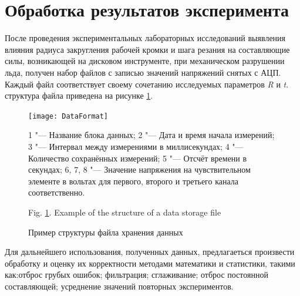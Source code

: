 
\section{Обработка результатов эксперимента}

После проведения экспериментальных лабораторных исследований выявления влияния радиуса закругления рабочей кромки и шага резания на составляющие силы, возникающей на дисковом инструменте, при механическом разрушении льда, получен набор файлов с записью значений напряжений снятых с АЦП. Каждый файл соответствует своему сочетанию исследуемых параметров \textit{R} и \textit{t}. структура файла приведена на рисунке \ref{fig:FileMap}.
\begin{figure}[ht]
	\centering
	\texttt{[image: DataFormat]}%

	1 "--- Название блока данных; 2 "--- Дата и время начала измерений; 3 "--- Интервал между измерениями в миллисекундах; 4 "--- Количество сохранённых измерений; 5 "--- Отсчёт времени в секундах; 6, 7, 8 "--- Значение напряжения на чувствительном элементе в вольтах для первого, второго и третьего канала соответственно.
	\caption{Пример структуры файла хранения данных}
	\label{fig:FileMap}
	Fig. \ref{fig:FileMap}. Example of the structure of a data storage file
\end{figure}
Для дальнейшего использования, полученных данных, предлагаеться произвести обработку и оценку их корректности методами математики и статистики, такими как:отброс грубых ошибок; фильтрация; сглаживание; отброс постоянной составляющей; усреднение значений повторных экспериментов.


